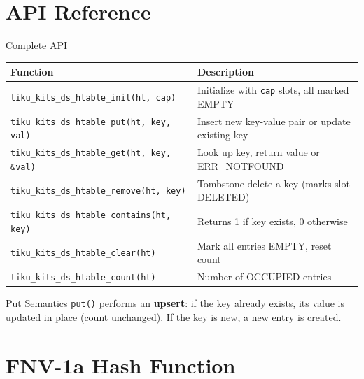 \documentclass[aspectratio=169, 10pt]{beamer}
\begin{document}
\section{API Reference}

\begin{frame}[fragile]{Complete API}
\begin{table}
\centering
\small
\begin{tabular}{@{}lp{8cm}@{}}
\toprule
\textbf{Function} & \textbf{Description} \\
\midrule
\texttt{tiku\_kits\_ds\_htable\_init(ht, cap)}
  & Initialize with \texttt{cap} slots, all marked EMPTY \\
\midrule
\texttt{tiku\_kits\_ds\_htable\_put(ht, key, val)}
  & Insert new key-value pair or update existing key \\
\texttt{tiku\_kits\_ds\_htable\_get(ht, key, \&val)}
  & Look up key, return value or ERR\_NOTFOUND \\
\texttt{tiku\_kits\_ds\_htable\_remove(ht, key)}
  & Tombstone-delete a key (marks slot DELETED) \\
\midrule
\texttt{tiku\_kits\_ds\_htable\_contains(ht, key)}
  & Returns 1 if key exists, 0 otherwise \\
\texttt{tiku\_kits\_ds\_htable\_clear(ht)}
  & Mark all entries EMPTY, reset count \\
\texttt{tiku\_kits\_ds\_htable\_count(ht)}
  & Number of OCCUPIED entries \\
\bottomrule
\end{tabular}
\end{table}

\vspace{0.3em}
\begin{alertblock}{Put Semantics}
\texttt{put()} performs an \textbf{upsert}: if the key already exists, its value
is updated in place (count unchanged). If the key is new, a new entry is created.
\end{alertblock}
\end{frame}

\section{FNV-1a Hash Function}
\end{document}
